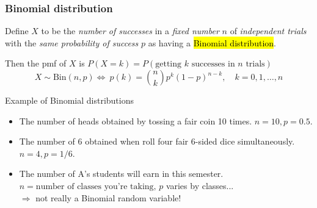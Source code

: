 \documentclass[slidestop,compress,mathserif]{beamer}
\begin{document}
\begin{frame}\frametitle{Binomial distribution}
\begin{defn}
Define $X$ to be the \emph{number of successes} in a \emph{fixed number} $n$
of \emph{independent trials} with the \emph{same probability of success} $p$ as having a \hl{Binomial distribution}.

\pause
Then the pmf of $X$ is $P(X = k) = P(\text{getting } k \text{ successes in } n \text{ trials})$
\pause \vspace{-0.3cm}
\[ X \sim \text{Bin}(n,p) \Longleftrightarrow \ p(k) = {n \choose k} p^k(1-p)^{n-k}, \quad k = 0, 1, \ldots, n\]

\end{defn}

\pause
Example of Binomial distributions
\begin{itemize}
\item The number of heads obtained by tossing a fair coin 10 times. $n = 10, p = 0.5$. \pause
\item The number of 6 obtained when roll four fair 6-sided dice simultaneously. $n = 4, p = 1/6$. \pause
\item The number of  A's students will earn in this semester. $n = \text{number of classes you're taking, } p$ varies by classes...\\
$\Longrightarrow$ not really a Binomial random variable!

\end{itemize}


\end{frame}
\end{document}
